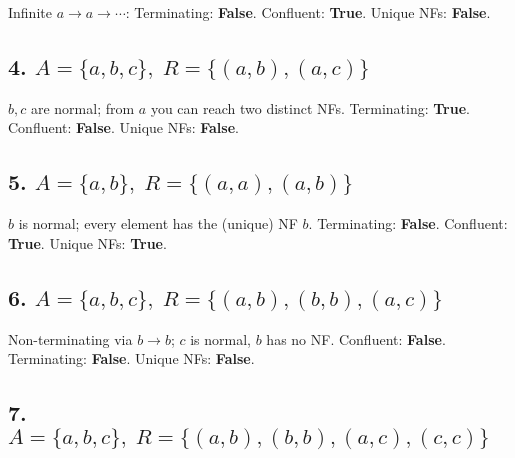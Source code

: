 \documentclass[11pt]{article}
\newcommand{\ARSnode}[1]{%
  \node[circle,draw,minimum size=7mm,inner sep=0pt] (#1) {$#1$};%
}
\newcommand{\ARSnodeat}[2]{%
  \node[circle,draw,minimum size=7mm,inner sep=0pt, #2] (#1) {$#1$};%
}
\begin{document}
Infinite $a\to a\to\cdots$: Terminating: \textbf{False}. Confluent: \textbf{True}. Unique NFs: \textbf{False}.

\subsection*{4.\; $A=\{a,b,c\},\; R=\{(a,b),(a,c)\}$}

$b,c$ are normal; from $a$ you can reach two distinct NFs. Terminating: \textbf{True}. Confluent: \textbf{False}. Unique NFs: \textbf{False}.

\subsection*{5.\; $A=\{a,b\},\; R=\{(a,a),(a,b)\}$}

$b$ is normal; every element has the (unique) NF $b$. Terminating: \textbf{False}. Confluent: \textbf{True}. Unique NFs: \textbf{True}.

\subsection*{6.\; $A=\{a,b,c\},\; R=\{(a,b),(b,b),(a,c)\}$}

Non-terminating via $b\to b$; $c$ is normal, $b$ has no NF. Confluent: \textbf{False}. Terminating: \textbf{False}. Unique NFs: \textbf{False}.

\subsection*{7.\; $A=\{a,b,c\},\; R=\{(a,b),(b,b),(a,c),(c,c)\}$}
\end{document}

